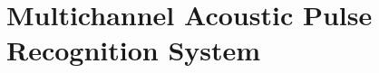 \chapter{Multichannel Acoustic Pulse Recognition System}\label{ch:MultichannelAPR}

\ifpdf
    \graphicspath{{Chapter4_MultiAPR/Chapter4Figs/PNG/}{Chapter4_MultiAPR/Chapter4Figs/PDF/}{Chapter4_MultiAPR/Chapter4Figs/}}
\else
    \graphicspath{{Chapter4_MultiAPR/Chapter4Figs/EPS/}{Chapter4_MultiAPR/Chapter4Figs/}}
\fi



